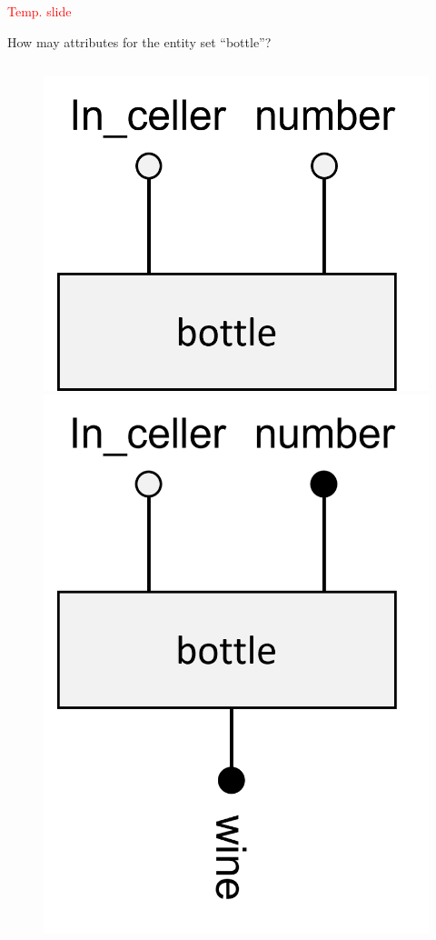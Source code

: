 \begin{frame}[fragile]{\textcolor{red}{Temp. slide}}

How may attributes for the entity set ``bottle''?
\begin{figure}
\begin{columns}
	\includegraphics[width=1\textwidth]{t4/images/bottle_entity.png}
	\includegraphics[width=1\textwidth]{t4/images/bottle_entity_1fk.png}

\end{columns}
\end{figure}
\end{frame}
